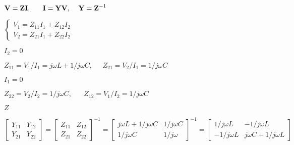 \documentclass{article}
\def\lthtmlcheckvsize{\ifdim\ht\sizebox<\vsize 
  \ifdim\wd\sizebox<\hsize\expandafter\hfill\fi \expandafter\vfill
  \else\expandafter\vss\fi}%
\begin{document}
{\newpage\clearpage
{}%
$\displaystyle {\bf V}={\bf Z} {\bf I},\;\;\;\;\;\;
{\bf I}={\bf Y} {\bf V},\;\;\;\;{\bf Y}={\bf Z}^{-1}$%
\lthtmlindisplaymathZ
\lthtmlcheckvsize\clearpage}

{\newpage\clearpage
{}%
$\displaystyle \left\{ \begin{array}{l} V_1=Z_{11}I_1+Z_{12}I_2 \\
V_2=Z_{21}I_1+Z_{22}I_2 \end{array} \right.$%
\lthtmlindisplaymathZ
\lthtmlcheckvsize\clearpage}

{\newpage\clearpage
{}%
$ I_2=0$%
\lthtmlindisplaymathZ
\lthtmlcheckvsize\clearpage}

{\newpage\clearpage
{}%
$\displaystyle Z_{11}=V_1/I_1=j\omega L+1/j\omega C,\;\;\;\;\;Z_{21}=V_2/I_1=1/j\omega C$%
\lthtmlindisplaymathZ
\lthtmlcheckvsize\clearpage}

{\newpage\clearpage
{}%
$ I_1=0$%
\lthtmlindisplaymathZ
\lthtmlcheckvsize\clearpage}

{\newpage\clearpage
{}%
$\displaystyle Z_{22}=V_2/I_2=1/j\omega C,\;\;\;\;\;\;Z_{12}=V_1/I_2=1/j\omega C$%
\lthtmlindisplaymathZ
\lthtmlcheckvsize\clearpage}

{\newpage\clearpage
{}%
$ Z$%
\lthtmlindisplaymathZ
\lthtmlcheckvsize\clearpage}

{\newpage\clearpage
{}%
$\displaystyle \left[\begin{array}{cc}Y_{11}&Y_{12}\\Y_{21}&Y_{22}\end{array}\right]
=\left[\begin{array}{cc}Z_{11}&Z_{12}\\Z_{21}&Z_{22}\end{array}\right]^{-1}
=\left[\begin{array}{cc}j\omega L+1/j\omega C & 1/j\omega C\\
1/j\omega C & 1/j\omega \end{array}\right]^{-1}
=\left[\begin{array}{cc}1/j\omega L & -1/j\omega L\\
-1/j\omega L & j\omega C+1/j\omega L\end{array}\right]$%
\lthtmlindisplaymathZ
\lthtmlcheckvsize\clearpage}
\end{document}
